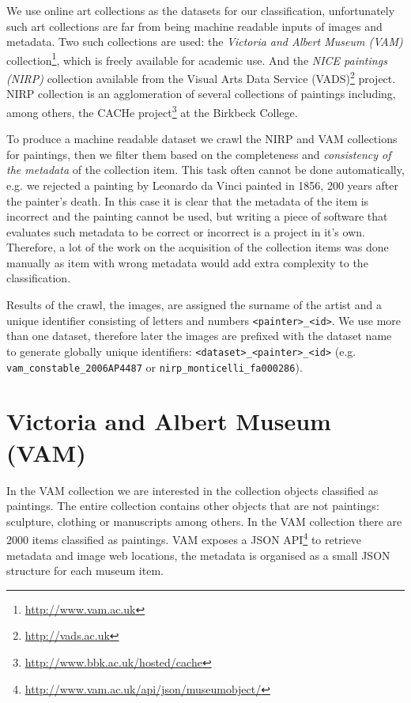 \documentclass[11pt,a4paper,draft]{report}
\begin{document}
\begin{multicols}{2}

We use online art collections as the datasets for our classification,
unfortunately such art collections are far from being machine readable inputs
of images and metadata.  Two such collections are used: the \emph{Victoria and
Albert Museum (VAM)} collection\footnote{\href{http://www.vam.ac.uk/}
{http://www.vam.ac.uk}}, which is freely available for academic use.  And the
\emph{NICE paintings (NIRP)} collection available from the Visual Arts Data
Service (VADS)\footnote{\href{http://vads.ac.uk/}{http://vads.ac.uk}} project.
NIRP collection is an agglomeration of several collections of paintings
including, among others, the CACHe project\footnote{
\href{http://www.bbk.ac.uk/hosted/cache/}{http://www.bbk.ac.uk/hosted/cache}}
at the Birkbeck College.

To produce a machine readable dataset we crawl the NIRP and VAM collections for
paintings, then we filter them based on the completeness and \emph{consistency
of the metadata} of the collection item.  This task often cannot be done
automatically, e.g. we rejected a painting by Leonardo da Vinci painted in
1856, 200 years after the painter's death.  In this case it is clear that the
metadata of the item is incorrect and the painting cannot be used, but writing
a piece of software that evaluates such metadata to be correct or incorrect is
a project in it's own.  Therefore, a lot of the work on the acquisition of the
collection items was done manually as item with wrong metadata would add extra
complexity to the classification.

Results of the crawl, the images, are assigned the surname of the artist and a
unique identifier consisting of letters and numbers \texttt{<painter>\_<id>}.
We use more than one dataset, therefore later the images are prefixed with the
dataset name to generate globally unique identifiers:
\texttt{<dataset>\_<painter>\_<id>} (e.g. \texttt{vam\_constable\_2006AP4487}
or \texttt{nirp\_monticelli\_fa000286}).

\section{Victoria and Albert Museum (VAM)}

In the VAM collection we are interested in the collection objects classified as
paintings.  The entire collection contains other objects that are not
paintings: sculpture, clothing or manuscripts among others.  In the VAM
collection there are 2000 items classified as paintings.  VAM exposes a JSON
API\footnote{\href{http://www.vam.ac.uk/api/json/museumobject/}
{http://www.vam.ac.uk/api/json/museumobject/}} to retrieve metadata and image
web locations, the metadata is organised as a small JSON structure for each
museum item.


\end{multicols}
\end{document}
